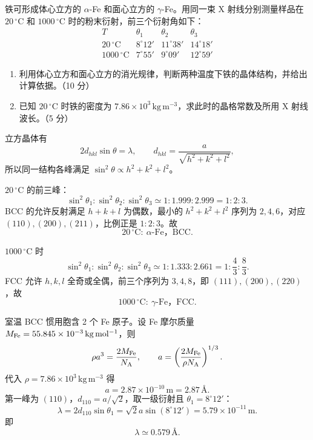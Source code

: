\begin{question}[15 分]
铁可形成体心立方的 $\alpha$-Fe 和面心立方的 $\gamma$-Fe。用同一束 X 射线分别测量样品在 $20\,{}^\circ\mathrm C$ 和 $1000\,{}^\circ\mathrm C$ 时的粉末衍射，前三个衍射角如下：
\[
\begin{array}{c|ccc}
  T & \theta_1 & \theta_2 & \theta_3\\ \hline
  20\,{}^\circ\mathrm C
    & 8^\circ12' & 11^\circ38' & 14^\circ18'\\
  1000\,{}^\circ\mathrm C
    & 7^\circ55' & 9^\circ09' & 12^\circ59'
\end{array}
\]
\begin{enumerate}
  \item 利用体心立方和面心立方的消光规律，判断两种温度下铁的晶体结构，并给出计算依据。（10 分）
  \item 已知 $20\,{}^\circ\mathrm C$ 时铁的密度为 $7.86\times10^3\,\mathrm{kg\,m^{-3}}$，求此时的晶格常数及所用 X 射线波长。（5 分）
\end{enumerate}


\begin{solution}
立方晶体有
\[
 2d_{hkl}\sin\theta=\lambda,
 \qquad d_{hkl}=\frac a{\sqrt{h^2+k^2+l^2}},
\]
所以同一结构各峰满足
$\sin^2\theta\propto h^2+k^2+l^2$。

$20\,{}^\circ\mathrm C$ 的前三峰：
\[
 \sin^2\theta_1:\sin^2\theta_2:\sin^2\theta_3
 \simeq1:1.999:2.999=1:2:3.
\]
BCC 的允许反射满足 $h+k+l$ 为偶数，最小的
$h^2+k^2+l^2$ 序列为 $2,4,6$，对应 $(110),(200),(211)$，比例正是 $1:2:3$。故
\[
 \boxed{20\,{}^\circ\mathrm C:\ \alpha\text{-Fe，BCC}.}
\]

$1000\,{}^\circ\mathrm C$ 时
\[
 \sin^2\theta_1:\sin^2\theta_2:\sin^2\theta_3
 \simeq1:1.333:2.661=1:\frac43:\frac83.
\]
FCC 允许 $h,k,l$ 全奇或全偶，前三个序列为
$3,4,8$，即 $(111),(200),(220)$，故
\[
 \boxed{1000\,{}^\circ\mathrm C:\ \gamma\text{-Fe，FCC}.}
\]

室温 BCC 惯用胞含 2 个 Fe 原子。设 Fe 摩尔质量
$M_{\rm Fe}=55.845\times10^{-3}\,\mathrm{kg\,mol^{-1}}$，则
\[
 \rho a^3=\frac{2M_{\rm Fe}}{N_{\mathrm A}},
 \qquad
 a=\left(\frac{2M_{\rm Fe}}{\rho N_{\mathrm A}}\right)^{1/3}.
\]
代入 $\rho=7.86\times10^3\,\mathrm{kg\,m^{-3}}$ 得
\[
 \boxed{a=2.87\times10^{-10}\,\mathrm m=2.87\,\text{\AA}.}
\]
第一峰为 $(110)$，$d_{110}=a/\sqrt2$，取一级衍射且
$\theta_1=8^\circ12'$：
\[
 \lambda=2d_{110}\sin\theta_1
 =\sqrt2a\sin(8^\circ12')
 =5.79\times10^{-11}\,\mathrm m.
\]
即
\[
 \boxed{\lambda\simeq0.579\,\text{\AA}.}
\]
\end{solution}
\end{question}

